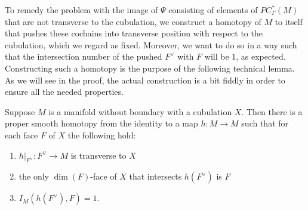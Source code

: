 To remedy the problem with the image of $\Psi$ consisting of elements of $PC^*_\Gamma(M)$ that are not transverse to the cubulation, we construct a homotopy of $M$ to itself that pushes these cochains into transverse position with respect to the cubulation, which we regard as fixed.
Moreover, we want to do so in a way such that the intersection number of the pushed $F^\vee$ with $F$ will be $1$, as expected.
Constructing such a homotopy is the purpose of the following technical lemma.
As we will see in the proof, the actual construction is a bit fiddly in order to ensure all the needed properties.

\begin{lemma}\label{L: push dual}
	Suppose $M$ is a manifold without boundary with a cubulation $X$.
	Then there is a proper smooth homotopy from the identity to a map $h \colon M \to M$ such that for each face $F$ of $X$ the following hold:
	\begin{enumerate}
		\item $h|_{F^\vee} \colon F^\vee \to M$ is transverse to $X$
		\item the only $\dim(F)$-face of $X$ that intersects $h(F^\vee)$ is $F$
		\item $I_M(h(F^\vee),F) = 1$.
	\end{enumerate}
\end{lemma}


